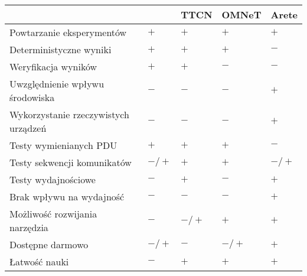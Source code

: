 \documentclass[00-praca-magisterska.tex]{subfiles}
\begin{document}
\begin{small}
\begin{center}
   \begin{tabular}{ l || C{1.1cm} | C{1.1cm} | C{1.1cm} | C{1.1cm}   }
      \hline
      & \small{\parbox[top][2.4em][c]{1.1cm}{}} & \small{TTCN} & \small{OMNeT} & \small{Arete} \\
      \hline
      Powtarzanie eksperymentów & $+$ & $+$ & $+$ & $+$ \\
      \hline
      Deterministyczne wyniki & $+$ & $+$ & $+$ & $-$ \\
      \hline
      Weryfikacja wyników & $+$ & $+$ & $-$ & $-$ \\
      \hline
      Uwzględnienie wpływu środowiska & $-$ & $-$ & $-$ & $+$ \\
      \hline
      Wykorzystanie rzeczywistych urządzeń & $-$ & $-$ & $-$ & $+$ \\
      \hline
      Testy wymienianych PDU & $+$ & $+$ & $+$ & $-$ \\
      \hline
      Testy sekwencji komunikatów & $-/+$ & $+$ & $+$ & $-/+$ \\
      \hline
      Testy wydajnościowe & $-$ & $+$ & $-$ & $+$ \\
      \hline
      Brak wpływu na wydajność & $-$ & $-$ & $-$ & $+$ \\
      \hline
      Możliwość rozwijania narzędzia & $-$ & $-/+$ & $+$ & $+$ \\
      \hline
      Dostępne darmowo & $-/+$ & $-$ & $-/+$ & $+$ \\
      \hline
      Łatwość nauki & $-$ &  $+$ & $+$ & $+$ \\
      \hline

  \end{tabular}
\end{center}
\end{small}

\end{document}
